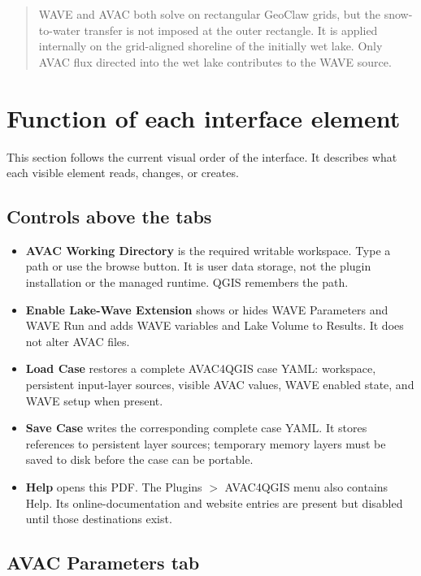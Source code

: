 \documentclass[11pt,a4paper]{article}
\newcommand{\control}[1]{\textbf{#1}}
\newenvironment{notebox}{%
  \begin{quote}\small\color{avacgray}\noindent
}{%
  \end{quote}
}
\begin{document}
\begin{notebox}
WAVE and AVAC both solve on rectangular GeoClaw grids, but the snow-to-water
transfer is not imposed at the outer rectangle. It is applied internally on
the grid-aligned shoreline of the initially wet lake. Only AVAC flux directed
into the wet lake contributes to the WAVE source.
\end{notebox}

\section{Function of each interface element}

This section follows the current visual order of the interface. It describes
what each visible element reads, changes, or creates.

\subsection{Controls above the tabs}

\begin{itemize}
  \item \control{AVAC Working Directory} is the required writable workspace.
        Type a path or use the browse button. It is user data storage, not the
        plugin installation or the managed runtime. QGIS remembers the path.
  \item \control{Enable Lake-Wave Extension} shows or hides WAVE Parameters
        and WAVE Run and adds WAVE variables and Lake Volume to Results. It
        does not alter AVAC files.
  \item \control{Load Case} restores a complete AVAC4QGIS case YAML: workspace,
        persistent input-layer sources, visible AVAC values, WAVE enabled
        state, and WAVE setup when present.
  \item \control{Save Case} writes the corresponding complete case YAML. It
        stores references to persistent layer sources; temporary memory layers
        must be saved to disk before the case can be portable.
  \item \control{Help} opens this PDF. The Plugins $>$ AVAC4QGIS menu also
        contains Help. Its online-documentation and website entries are present
        but disabled until those destinations exist.
\end{itemize}

\subsection{AVAC Parameters tab}
\end{document}
